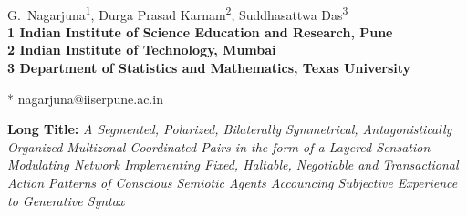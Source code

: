 \documentclass[10pt,fulladjust,letterpaper]{article}
\begin{document}
\vspace*{0.35in}

\begin{flushleft}
{\Large
\textbf{}
}
\newline
\\
G.~Nagarjuna\textsuperscript{1},
Durga Prasad Karnam\textsuperscript{2},
Suddhasattwa Das\textsuperscript{3}
\\
\bigskip
\bf{1} Indian Institute of Science Education and Research, Pune
\\
\bf{2} Indian Institute of Technology, Mumbai
\\
\bf{3} Department of Statistics and Mathematics, Texas University 

\bigskip
* nagarjuna@iiserpune.ac.in

\end{flushleft}
\noindent \textbf{Long Title:} \textit{A Segmented, Polarized,
  Bilaterally Symmetrical, Antagonistically Organized Multizonal
  Coordinated Pairs in the form of a Layered Sensation Modulating
  Network Implementing Fixed, Haltable, Negotiable and Transactional Action
  Patterns of Conscious Semiotic Agents Accouncing Subjective
  Experience to Generative Syntax}













\end{document}
